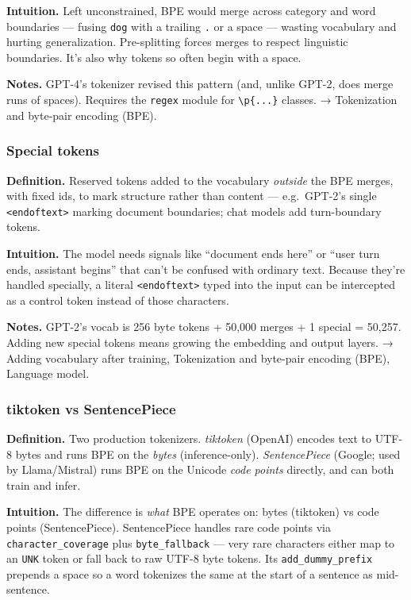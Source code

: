 \documentclass[
  10pt,
  letterpaper,
  onecolumn]{article}
\begin{document}
\textbf{Intuition.} Left unconstrained, BPE would merge across category
and word boundaries --- fusing \texttt{dog} with a trailing \texttt{.}
or a space --- wasting vocabulary and hurting generalization.
Pre-splitting forces merges to respect linguistic boundaries. It's also
why tokens so often begin with a space.

\textbf{Notes.} GPT-4's tokenizer revised this pattern (and, unlike
GPT-2, does merge runs of spaces). Requires the \texttt{regex} module
for \texttt{\textbackslash{}p\{...\}} classes. → Tokenization and
byte-pair encoding (BPE).

\hypertarget{special-tokens}{%
\subsubsection{Special tokens}\label{special-tokens}}

\textbf{Definition.} Reserved tokens added to the vocabulary
\emph{outside} the BPE merges, with fixed ids, to mark structure rather
than content --- e.g.~GPT-2's single
\texttt{\textless{}\textbar{}endoftext\textbar{}\textgreater{}} marking
document boundaries; chat models add turn-boundary tokens.

\textbf{Intuition.} The model needs signals like ``document ends here''
or ``user turn ends, assistant begins'' that can't be confused with
ordinary text. Because they're handled specially, a literal
\texttt{\textless{}\textbar{}endoftext\textbar{}\textgreater{}} typed
into the input can be intercepted as a control token instead of those
characters.

\textbf{Notes.} GPT-2's vocab is 256 byte tokens + 50,000 merges + 1
special = 50,257. Adding new special tokens means growing the embedding
and output layers. → Adding vocabulary after training, Tokenization and
byte-pair encoding (BPE), Language model.

\hypertarget{tiktoken-vs-sentencepiece}{%
\subsubsection{tiktoken vs
SentencePiece}\label{tiktoken-vs-sentencepiece}}

\textbf{Definition.} Two production tokenizers. \emph{tiktoken} (OpenAI)
encodes text to UTF-8 bytes and runs BPE on the \emph{bytes}
(inference-only). \emph{SentencePiece} (Google; used by Llama/Mistral)
runs BPE on the Unicode \emph{code points} directly, and can both train
and infer.

\textbf{Intuition.} The difference is \emph{what} BPE operates on: bytes
(tiktoken) vs code points (SentencePiece). SentencePiece handles rare
code points via \texttt{character\_coverage} plus
\texttt{byte\_fallback} --- very rare characters either map to an
\texttt{UNK} token or fall back to raw UTF-8 byte tokens. Its
\texttt{add\_dummy\_prefix} prepends a space so a word tokenizes the
same at the start of a sentence as mid-sentence.
\end{document}
